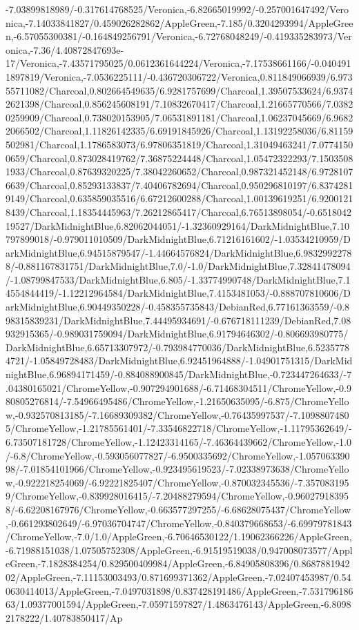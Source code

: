 {\begin{tikzternal}
-7.03899818989/-0.317614768525/Veronica,-6.82665019992/-0.257001647492/Veronica,-7.14033841827/0.459026282862/AppleGreen,-7.185/0.3204293994/AppleGreen,-6.57055300381/-0.164849256791/Veronica,-6.72768048249/-0.419335283973/Veronica,-7.36/4.40872847693e-17/Veronica,-7.43571795025/0.0612361644224/Veronica,-7.17538661166/-0.0404911897819/Veronica,-7.0536225111/-0.436720306722/Veronica,0.811849066939/6.97355711082/Charcoal,0.802664549635/6.9281757699/Charcoal,1.39507533624/6.93742621398/Charcoal,0.856245608191/7.10832670417/Charcoal,1.21665770566/7.03820259909/Charcoal,0.738020153905/7.06531891181/Charcoal,1.06237045669/6.96822066502/Charcoal,1.11826142335/6.69191845926/Charcoal,1.13192258036/6.81159502981/Charcoal,1.1786583073/6.97806351819/Charcoal,1.31049463241/7.07741500659/Charcoal,0.873028419762/7.36875224448/Charcoal,1.05472322293/7.15035081933/Charcoal,0.87639320225/7.38042260652/Charcoal,0.987321452148/6.97281076639/Charcoal,0.85293133837/7.40406782694/Charcoal,0.950296810197/6.83742819149/Charcoal,0.635859035516/6.67212600288/Charcoal,1.00139619251/6.92001218439/Charcoal,1.18354445963/7.26212865417/Charcoal,6.76513898054/-0.651804219527/DarkMidnightBlue,6.82062044051/-1.32360929164/DarkMidnightBlue,7.10797899018/-0.979011010509/DarkMidnightBlue,6.71216161602/-1.03534210959/DarkMidnightBlue,6.94515879547/-1.44664576824/DarkMidnightBlue,6.98329922788/-0.881167831751/DarkMidnightBlue,7.0/-1.0/DarkMidnightBlue,7.32841478094/-1.08799847533/DarkMidnightBlue,6.805/-1.33774990748/DarkMidnightBlue,7.14554844419/-1.12212964584/DarkMidnightBlue,7.4153481053/-0.888707810606/DarkMidnightBlue,6.90449350228/-0.458355735843/DebianRed,6.77161363559/-0.898315839231/DarkMidnightBlue,7.44495934691/-0.676718111239/DebianRed,7.08932915365/-0.989031759094/DarkMidnightBlue,6.91794646302/-0.806693980775/DarkMidnightBlue,6.65713307972/-0.793984770036/DarkMidnightBlue,6.52357784721/-1.05849728483/DarkMidnightBlue,6.92451964888/-1.04901751315/DarkMidnightBlue,6.96894171459/-0.884088900845/DarkMidnightBlue,-0.723447264633/-7.04380165021/ChromeYellow,-0.907294901688/-6.71468304511/ChromeYellow,-0.980805276814/-7.54966495486/ChromeYellow,-1.21650635095/-6.875/ChromeYellow,-0.932570813185/-7.16689309382/ChromeYellow,-0.76435997537/-7.10988074805/ChromeYellow,-1.21785561401/-7.33546822718/ChromeYellow,-1.11795362649/-6.73507181728/ChromeYellow,-1.12423314165/-7.46364439662/ChromeYellow,-1.0/-6.8/ChromeYellow,-0.593056077827/-6.9500335692/ChromeYellow,-1.05706339098/-7.01854101966/ChromeYellow,-0.923495619523/-7.02338973638/ChromeYellow,-0.922218254069/-6.92221825407/ChromeYellow,-0.870032345536/-7.3570831959/ChromeYellow,-0.839928016415/-7.20488279594/ChromeYellow,-0.960279183958/-6.62208167976/ChromeYellow,-0.663577297255/-6.68628075437/ChromeYellow,-0.661293802649/-6.97036704747/ChromeYellow,-0.840379668653/-6.69979781843/ChromeYellow,-7.0/1.0/AppleGreen,-6.70646530122/1.19062366226/AppleGreen,-6.71988151038/1.07505752308/AppleGreen,-6.91519519038/0.947008073577/AppleGreen,-7.1828384254/0.829500409984/AppleGreen,-6.84905808396/0.868788194202/AppleGreen,-7.11153003493/0.871699371362/AppleGreen,-7.02407453987/0.540630414013/AppleGreen,-7.0497031898/0.837428191486/AppleGreen,-7.53179618663/1.09377001594/AppleGreen,-7.05971597827/1.4863476143/AppleGreen,-6.80982178222/1.40783850417/Ap
\end{tikzternal}}
